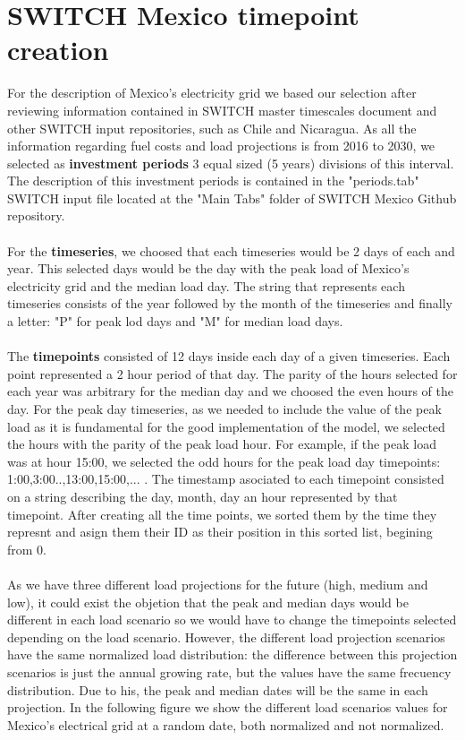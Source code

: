 \documentclass{article}
\begin{document}
\section{SWITCH Mexico timepoint creation}
For the description of Mexico's electricity grid we based our selection after reviewing information contained in SWITCH master timescales document \cite{master} and other SWITCH input repositories, such as Chile\cite{chile} and Nicaragua. As all the information regarding fuel costs and load projections is from 2016 to 2030, we selected as \textbf{investment periods} 3 equal sized (5 years) divisions of this interval. The description of this investment periods is contained in the "periods.tab"  SWITCH input file located at the "Main Tabs" folder of SWITCH Mexico Github repository\cite{repo}. 
\\
\\For the \textbf{timeseries}, we choosed that each timeseries would be 2 days of each and year. This selected days would be the day with the peak load of Mexico's electricity grid and the median load day. The string that represents each timeseries consists of the year followed by the month of the timeseries and finally a letter: "P" for peak lod days and "M" for median load days.
\\
\\The \textbf{timepoints} consisted of 12 days inside each day of a given timeseries. Each point represented a 2 hour period of that day. The parity of the hours selected for each year was arbitrary for the median day and we choosed the even hours of the day. For the peak day timeseries, as we needed to include the value of the peak load as it is fundamental for the good implementation of the model, we selected the hours with the parity of the peak load hour. For example, if the peak load was at hour 15:00, we selected the odd hours for the peak load day timepoints: 1:00,3:00..,13:00,15:00,... . The timestamp asociated to each timepoint consisted on a string describing the day, month, day an hour represented by that timepoint. After creating all the time points, we sorted them by the time they represnt and asign them their ID as their position in this sorted list, begining from 0.
\\
\\As we have three different load projections for the future (high, medium and low), it could exist the objetion that the peak and median days would be different in each load scenario so we would have to change the timepoints selected depending on the load scenario. However, the different load projection scenarios have the same normalized load distribution: the difference between this projection scenarios is just the annual growing rate, but the values have the same frecuency distribution. Due to his, the peak and median dates will be the same in each projection. In the following figure we show the different load scenarios values for Mexico's electrical grid at a random date, both normalized and not normalized.
\end{document}
